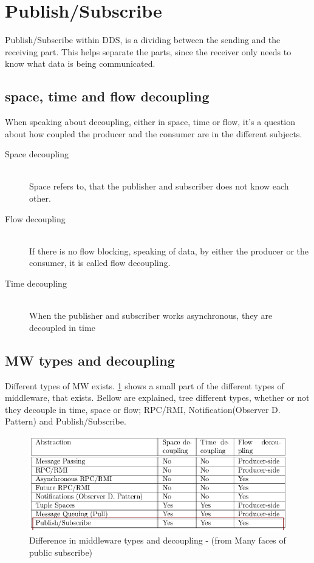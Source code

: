 \section{Publish/Subscribe}
Publish/Subscribe within DDS, is a dividing between the sending and the receiving part. This helps separate the parts, since the receiver only needs to know what data is being communicated.

\subsection{space, time and flow decoupling}
When speaking about decoupling, either in space, time or flow, it's a question about how coupled the producer and the consumer are in the different subjects.
\begin{description}
 \item[Space decoupling] \hfill \\
 Space refers to, that the publisher and subscriber does not know each other.
 \item[Flow decoupling] \hfill \\
 If there is no flow blocking, speaking of data, by either the producer or the consumer, it is called flow decoupling.
 \item[Time decoupling] \hfill \\
 When the publisher and subscriber works asynchronous, they are decoupled in time
\end{description}

\subsection{MW types and decoupling}
Different types of MW exists. \ref{DeInPa} shows a small part of the different types of middleware, that exists.
Bellow are explained, tree different types, whether or not they decouple in time, space or flow; RPC/RMI, Notification(Observer D. Pattern) and Publish/Subscribe.

\begin{figure}[ht!]
\centering
\includegraphics[width=150mm]{img/DecouplingInteractionParadigms.png}
\caption{Difference in middleware types and decoupling - (from Many faces of public subscribe)}
\label{DeInPa}
\end{figure}

